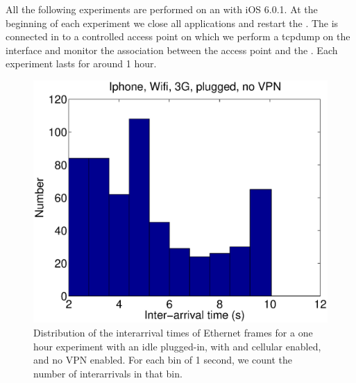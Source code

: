 All the following experiments are performed on an  with iOS
6.0.1.  At the beginning of each experiment we close all applications
and restart the \iphone{}. The \iphone{} is connected in \wifi{} to a
controlled access point on which we perform a tcpdump on the \wifi{}
interface and monitor the \wifi{} association between the access point
and the \iphone{}. Each experiment lasts for around 1 hour. 

\begin{figure}
\centering
        \includegraphics[width=0.8\linewidth]{../../code/pushNotification/Fig/bw_iphone_wifi_3g_plug_novpn_interTs.eps}
  \caption{Distribution of the interarrival times of Ethernet frames
    for a one hour experiment with an idle \iphone{} plugged-in, with \wifi{} and cellular
    enabled, and no VPN enabled. For each bin of 1 second, we count
    the number of interarrivals in that bin.}
  \label{fig:push_w3p_interTs}
\end{figure}


